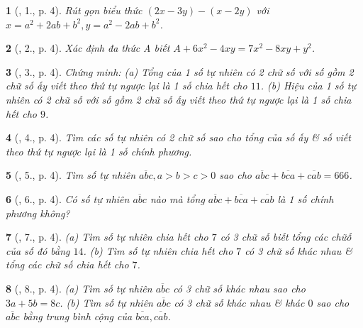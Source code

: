 \documentclass{article}
\newtheorem{baitoan}{}
\begin{document}
\begin{baitoan}[\cite{Binh_Toan_8_tap_1}, 1., p. 4]
	Rút gọn biểu thức $(2x - 3y) - (x - 2y)$ với $x = a^2 + 2ab + b^2,y = a^2 - 2ab + b^2$.
\end{baitoan}

\begin{baitoan}[\cite{Binh_Toan_8_tap_1}, 2., p. 4]
	Xác định đa thức A biết $A + 6x^2 - 4xy = 7x^2 - 8xy + y^2$.
\end{baitoan}

\begin{baitoan}[\cite{Binh_Toan_8_tap_1}, 3., p. 4]
	Chứng minh: (a) Tổng của 1 số tự nhiên có 2 chữ số với số gồm 2 chữ số ấy viết theo thứ tự ngược lại là 1 số chia hết cho $11$. (b) Hiệu của 1 số tự nhiên có 2 chữ số với số gồm 2 chữ số ấy viết theo thứ tự ngược lại là 1 số chia hết cho $9$.
\end{baitoan}

\begin{baitoan}[\cite{Binh_Toan_8_tap_1}, 4., p. 4]
	Tìm các số tự nhiên có 2 chữ số sao cho tổng của số ấy \& số viết theo thứ tự ngược lại là 1 số chính phương.
\end{baitoan}

\begin{baitoan}[\cite{Binh_Toan_8_tap_1}, 5., p. 4]
	Tìm số tự nhiên $\overline{abc},a > b > c > 0$ sao cho $\overline{abc} + \overline{bca} + \overline{cab} = 666$.
\end{baitoan}

\begin{baitoan}[\cite{Binh_Toan_8_tap_1}, 6., p. 4]
	Có số tự nhiên $\overline{abc}$ nào mà tổng $\overline{abc} + \overline{bca} + \overline{cab}$ là 1 số chính phương không?
\end{baitoan}

\begin{baitoan}[\cite{Binh_Toan_8_tap_1}, 7., p. 4]
	(a) Tìm số tự nhiên chia hết cho $7$ có 3 chữ số biết tổng các chữố của số đó bằng $14$. (b) Tìm số tự nhiên chia hết cho $7$ có 3 chữ số khác nhau \& tổng các chữ số chia hết cho $7$.
\end{baitoan}

\begin{baitoan}[\cite{Binh_Toan_8_tap_1}, 8., p. 4]
	(a) Tìm số tự nhiên $\overline{abc}$ có 3 chữ số khác nhau sao cho $3a + 5b = 8c$. (b) Tìm số tự nhiên $\overline{abc}$ có 3 chữ số khác nhau \& khác $0$ sao cho $\overline{abc}$ bằng trung bình cộng của $\overline{bca},\overline{cab}$.
\end{baitoan}
\end{document}
